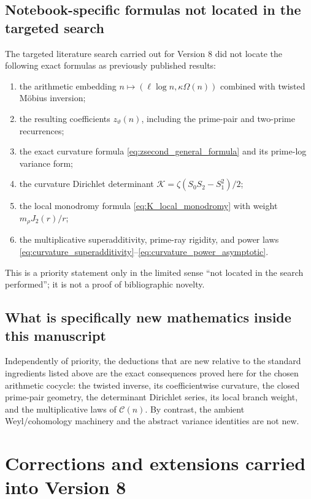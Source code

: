 \documentclass[11pt]{amsart}
\numberwithin{equation}{section}
\theoremstyle{plain}
\theoremstyle{definition}
\theoremstyle{remark}
\begin{document}
\subsection{Notebook-specific formulas not located in the targeted search}
\label{subsec:notebook_specific_formulas}
The targeted literature search carried out for Version 8 did not locate the
following exact formulas as previously published results:
\begin{enumerate}[leftmargin=*]
\item the arithmetic embedding
\(n\mapsto(\ell\log n,\kappa\Omega(n))\) combined with twisted M\"obius
inversion;
\item the resulting coefficients \(z_\vartheta(n)\), including the
prime-pair and two-prime recurrences;
\item the exact curvature formula
\eqref{eq:zsecond_general_formula} and its prime-log variance form;
\item the curvature Dirichlet determinant
\(\mathcal K=\zeta(S_0S_2-S_1^2)/2\);
\item the local monodromy formula
\eqref{eq:K_local_monodromy} with weight \(m_\rho J_2(r)/r\);
\item the multiplicative superadditivity, prime-ray rigidity, and power laws
\eqref{eq:curvature_superadditivity}--\eqref{eq:curvature_power_asymptotic}.
\end{enumerate}
This is a priority statement only in the limited sense ``not located in the
search performed''; it is not a proof of bibliographic novelty.

\subsection{What is specifically new mathematics inside this manuscript}
\label{subsec:new_math_v8}
Independently of priority, the deductions that are new relative to the
standard ingredients listed above are the exact consequences proved here for
the chosen arithmetic cocycle: the twisted inverse, its coefficientwise
curvature, the closed prime-pair geometry, the determinant Dirichlet series,
its local branch weight, and the multiplicative laws of
\(\mathcal C(n)\).  By contrast, the ambient Weyl/cohomology machinery and
the abstract variance identities are not new.

\section{Corrections and extensions carried into Version 8}
\label{sec:v2_audit_corrections}
\end{document}
